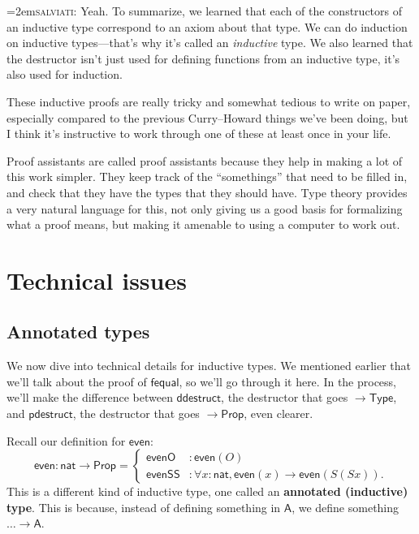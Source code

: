 \documentclass[11pt,paper=letter]{scrartcl}
\renewcommand{\sf}{\mathsf}
\newcommand{\salv}{\vspace{0.5em}\noindent\hangindent=2em\textsc{salviati:} }
\newcommand{\prop}{\mathsf{Prop}}
\newcommand{\type}{\mathsf{Type}}
\begin{document}
\salv Yeah. To summarize, we learned that each of the constructors of an inductive type correspond to an axiom about that type. We can do induction on inductive types---that's why it's called an \emph{inductive} type. We also learned that the destructor isn't just used for defining functions from an inductive type, it's also used for induction.

\vspace{0.5em}

These inductive proofs are really tricky and somewhat tedious to write on paper, especially compared to the previous Curry–Howard things we've been doing, but I think it's instructive to work through one of these at least once in your life.

Proof assistants are called proof assistants because they help in making a lot of this work simpler. They keep track of the ``somethings'' that need to be filled in, and check that they have the types that they should have. Type theory provides a very natural language for this, not only giving us a good basis for formalizing what a proof means, but making it amenable to using a computer to work out.

\clearpage

\section{Technical issues}

\subsection{Annotated types}

We now dive into technical details for inductive types. We mentioned earlier that we'll talk about the proof of $\sf{fequal}$, so we'll go through it here. In the process, we'll make the difference between $\sf{ddestruct}$, the destructor that goes $\to \type$, and $\sf{pdestruct}$, the destructor that goes $\to \prop$, even clearer.

Recall our definition for $\sf{even}$: \[
  \sf{even} : \sf{nat} \to \prop = \begin{cases}
    \sf{evenO} &: \sf{even}(O) \\
    \sf{evenSS} &: \forall x: \sf{nat}, \sf{even}(x) \to \sf{even}(S(Sx)).
  \end{cases}
\]
This is a different kind of inductive type, one called an \textbf{annotated (inductive) type}. This is because, instead of defining something in $\sf{A}$, we define something $\dots \to \sf{A}$.
\end{document}
